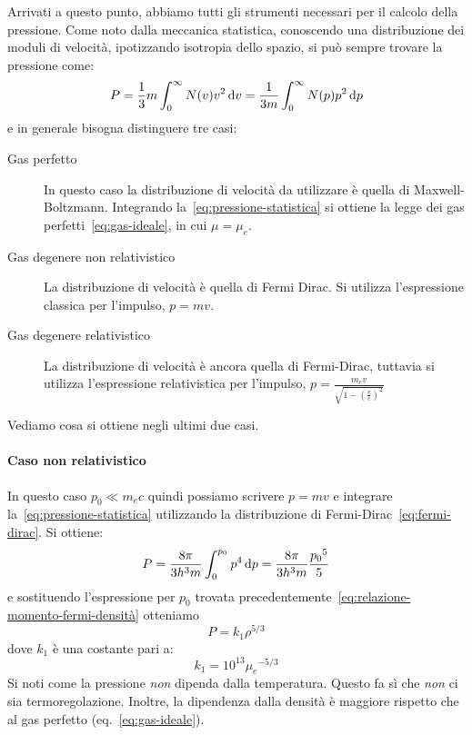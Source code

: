 Arrivati a questo punto, abbiamo tutti gli strumenti necessari per il calcolo della pressione. Come noto dalla meccanica statistica, conoscendo una distribuzione dei moduli di velocità, ipotizzando isotropia dello spazio, si può sempre trovare la pressione come:
\begin{equation}\label{eq:pressione-statistica}
    P = \frac{1}{3} m \int_0^\infty N(v) v^2 \mathop{}\!\mathrm{d} v = \frac{1}{3m} \int_0^\infty N(p) p^2 \mathop{}\!\mathrm{d} p
\end{equation}
e in generale bisogna distinguere tre casi:
\begin{description}
    \item[Gas perfetto] In questo caso la distribuzione di velocità da utilizzare è quella di Maxwell-Boltzmann. Integrando la~\eqref{eq:pressione-statistica} si ottiene la legge dei gas perfetti~\eqref{eq:gas-ideale}, in cui $\mu = \mu_e$.
    \item[Gas degenere non relativistico] La distribuzione di velocità è quella di Fermi Dirac. Si utilizza l'espressione classica per l'impulso, $p=mv$.
    \item[Gas degenere relativistico] La distribuzione di velocità è ancora quella di Fermi-Dirac, tuttavia si utilizza l'espressione relativistica per l'impulso, $p= \frac{m_e v}{\sqrt{1- (\frac{v}{c})^2}}$
\end{description}
Vediamo cosa si ottiene negli ultimi due casi.

\paragraph{Caso non relativistico}
In questo caso $p_0 \ll m_e c$ quindi possiamo scrivere $p=mv$ e integrare la~\eqref{eq:pressione-statistica} utilizzando la distribuzione di Fermi-Dirac~\eqref{eq:fermi-dirac}. Si ottiene:
\[
P = \dfrac{8\pi}{3h^3m} \int_0^{p_0} p^4 \mathop{}\!\mathrm{d} p = \dfrac{8\pi}{3h^3m}\dfrac{{p_0}^5}{5}
\]
e sostituendo l'espressione per $p_0$ trovata precedentemente~\ref{eq:relazione-momento-fermi-densità} otteniamo
\begin{equation}\label{eq:pressione-degenerazione-non-relativistica}
    P = k_1 \rho^{5/3}
\end{equation}
dove $k_1$ è una costante pari a:
\[
k_1 = 10^{13} {\mu_e}^{-5/3}
\]
Si noti come la pressione \emph{non} dipenda dalla temperatura. Questo fa sì che \emph{non} ci sia termoregolazione. Inoltre, la dipendenza dalla densità è maggiore rispetto che al gas perfetto (eq.~\eqref{eq:gas-ideale}).

